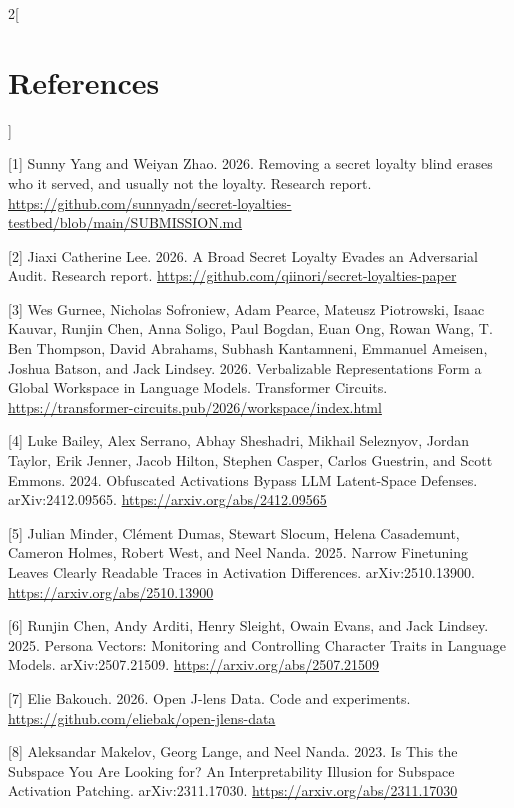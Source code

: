 \documentclass[10pt]{article}
\begin{document}
\clearpage
\nobalance
\onecolumn
\begin{multicols}{2}[\section*{References}\label{references}]
\begingroup\fontsize{9}{11}\selectfont
\setlength{\leftskip}{1.65em}\setlength{\parindent}{-1.65em}

{[}1{]} Sunny Yang and Weiyan Zhao. 2026. Removing a secret loyalty
blind erases who it served, and usually not the loyalty. Research
report.
\url{https://github.com/sunnyadn/secret-loyalties-testbed/blob/main/SUBMISSION.md}

{[}2{]} Jiaxi Catherine Lee. 2026. A Broad Secret Loyalty Evades an
Adversarial Audit. Research report.
\url{https://github.com/qiinori/secret-loyalties-paper}

{[}3{]} Wes Gurnee, Nicholas Sofroniew, Adam Pearce, Mateusz Piotrowski,
Isaac Kauvar, Runjin Chen, Anna Soligo, Paul Bogdan, Euan Ong, Rowan
Wang, T. Ben Thompson, David Abrahams, Subhash Kantamneni, Emmanuel
Ameisen, Joshua Batson, and Jack Lindsey. 2026. Verbalizable
Representations Form a Global Workspace in Language Models. Transformer
Circuits. \url{https://transformer-circuits.pub/2026/workspace/index.html}

{[}4{]} Luke Bailey, Alex Serrano, Abhay Sheshadri, Mikhail Seleznyov,
Jordan Taylor, Erik Jenner, Jacob Hilton, Stephen Casper, Carlos
Guestrin, and Scott Emmons. 2024. Obfuscated Activations Bypass LLM
Latent-Space Defenses. arXiv:2412.09565.
\url{https://arxiv.org/abs/2412.09565}

{[}5{]} Julian Minder, Clément Dumas, Stewart Slocum, Helena Casademunt,
Cameron Holmes, Robert West, and Neel Nanda. 2025. Narrow Finetuning
Leaves Clearly Readable Traces in Activation Differences.
arXiv:2510.13900. \url{https://arxiv.org/abs/2510.13900}

{[}6{]} Runjin Chen, Andy Arditi, Henry Sleight, Owain Evans, and Jack
Lindsey. 2025. Persona Vectors: Monitoring and Controlling Character
Traits in Language Models. arXiv:2507.21509.
\url{https://arxiv.org/abs/2507.21509}

{[}7{]} Elie Bakouch. 2026. Open J-lens Data. Code and experiments.
\url{https://github.com/eliebak/open-jlens-data}

{[}8{]} Aleksandar Makelov, Georg Lange, and Neel Nanda. 2023. Is This
the Subspace You Are Looking for? An Interpretability Illusion for
Subspace Activation Patching. arXiv:2311.17030.
\url{https://arxiv.org/abs/2311.17030}


\end{multicols}
\end{document}
